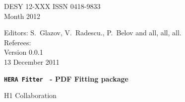 \documentclass[12pt,a4paper,dvips]{article}
\newcommand\fitter{ \mbox{\tt HERA Fitter} }
\begin{document}
\makeatletter \def\NAT@space{} \makeatother


\begin{titlepage}
 
\noindent
DESY 12-XXX \hfill ISSN 0418-9833 \\
 Month 2012 \\

\begin{flushleft}
Editors: S.~Glazov, V.~Radescu., P.~Belov and all, all, all.\\
Referees: \\

Version 0.0.1 \\
 13 December 2011
\end{flushleft}


\vspace*{3.5cm}

\begin{center}
\begin{Large}

{\bfseries
\fitter\ - PDF Fitting package
}

\vspace*{2cm}

H1 Collaboration

\end{Large}
\end{center}

\vspace*{2cm}


\end{titlepage}
\end{document}
